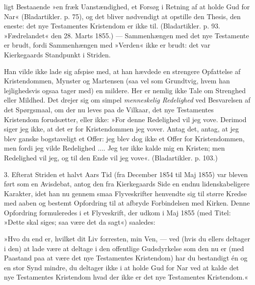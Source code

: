 \documentclass[12pt,a4paper,openany]{book}
\newcommand{\opage}[1]{\marginnote{\footnotesize\textit{[#1]}}}
\begin{document}
\opage{146}ligt Bestaaende »en fræk Uanstændighed, et Forsøg i
Retning af at holde Gud for Nar« (Bladartikler. p. 75),
og det bliver nødvendigt at opstille den Thesis, den
eneste: det nye Testamentes Kristendom er ikke til.
(Bladartikler. p. 93. »Fædrelandet« den 28. Marts 1855.)
--- Sammenhængen med det nye Testamente er brudt,
fordi Sammenhængen med »Verden« ikke er brudt: det
var Kierkegaards Standpunkt i Striden.

Han vilde ikke lade sig afspise med, at han hævdede
en strengere Opfattelse af Kristendommen, Mynster og
Martensen (saa vel som Grundtvig, hvem han lejlighedsvis
ogsaa tager med) en mildere. Her er nemlig ikke Tale
om Strenghed eller Mildhed. Det drejer sig om simpel
\textit{menneskelig Redelighed} ved Besvarelsen af det Spørgsmaal,
om der nu leves paa de Vilkaar, det nye Testamentes
Kristendom forudsætter, eller ikke: »For denne
Redelighed vil jeg vove. Derimod siger jeg ikke, at det
er for Kristendommen jeg vover. Antag det, antag, at
jeg blev ganske bogstaveligt et Offer: jeg blev dog ikke
et Offer for Kristendommen, men fordi jeg vilde Redelighed
.... Jeg tør ikke kalde mig en Kristen; men Redelighed
vil jeg, og til den Ende vil jeg vove«. (Bladartikler.
p. 103.)

3. Efterat Striden et halvt Aars Tid (fra December
1854 til Maj 1855) var bleven ført som en Avisdebat,
antog den fra Kierkegaards Side en endnu lidenskabeligere
Karakter, idet han nu gennem smaa Flyveskrifter
henvendte sig til større Kredse med aaben og bestemt
Opfordring til at afbryde Forbindelsen med Kirken.
Denne Opfordring formuleredes i et Flyveskrift, der udkom
i Maj 1855 (med Titel: »Dette skal siges; saa være
det da sagt«) saaledes:

»Hvo du end er, hvilket dit Liv forresten, min Ven,
--- ved (hvis du ellers deltager i den) at lade være at
\opage{147}deltage i den offentlige Gudsdyrkelse som den nu er (med
Paastand paa at være det nye Testamentes Kristendom)
har du bestandigt én og en stor Synd mindre, du deltager
ikke i at holde Gud for Nar ved at kalde det nye
Testamentes Kristendom hvad der ikke er det nye Testamentes
Kristendom.«
\end{document}
